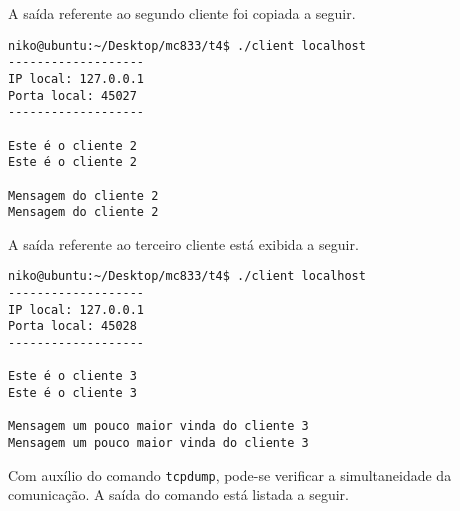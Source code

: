 \documentclass[a4paper,10pt]{article}
\begin{document}
A saída referente ao segundo cliente foi copiada a seguir.

\begin{lstlisting}
niko@ubuntu:~/Desktop/mc833/t4$ ./client localhost
-------------------
IP local: 127.0.0.1
Porta local: 45027
-------------------

Este é o cliente 2
Este é o cliente 2

Mensagem do cliente 2
Mensagem do cliente 2

\end{lstlisting}

A saída referente ao terceiro cliente está exibida a seguir.

\begin{lstlisting}
niko@ubuntu:~/Desktop/mc833/t4$ ./client localhost
-------------------
IP local: 127.0.0.1
Porta local: 45028
-------------------

Este é o cliente 3
Este é o cliente 3

Mensagem um pouco maior vinda do cliente 3
Mensagem um pouco maior vinda do cliente 3

\end{lstlisting}

Com auxílio do comando {\tt tcpdump}, pode-se verificar a simultaneidade da comunicação. A saída do comando está listada a seguir.
\end{document}
